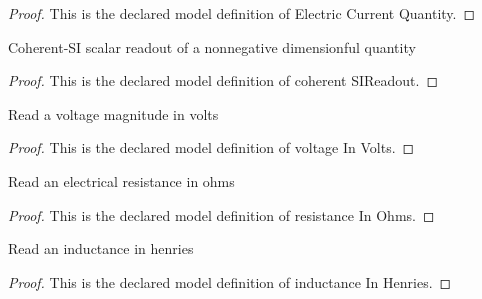 \begin{proof}
  This is the declared model definition of Electric Current Quantity.
\end{proof}
\begin{definition}
  \label{def:physics:phyx-mini-0881:phyxminiproblems-problemphyxmini0881-coherentsireadout}
  Coherent-SI scalar readout of a nonnegative dimensionful quantity
\end{definition}
\begin{proof}
  This is the declared model definition of coherent SIReadout.
\end{proof}
\begin{definition}
  \label{def:physics:phyx-mini-0881:phyxminiproblems-problemphyxmini0881-voltageinvolts}
  Read a voltage magnitude in volts
\end{definition}
\begin{proof}
  This is the declared model definition of voltage In Volts.
\end{proof}
\begin{definition}
  \label{def:physics:phyx-mini-0881:phyxminiproblems-problemphyxmini0881-resistanceinohms}
  Read an electrical resistance in ohms
\end{definition}
\begin{proof}
  This is the declared model definition of resistance In Ohms.
\end{proof}
\begin{definition}
  \label{def:physics:phyx-mini-0881:phyxminiproblems-problemphyxmini0881-inductanceinhenries}
  Read an inductance in henries
\end{definition}
\begin{proof}
  This is the declared model definition of inductance In Henries.
\end{proof}
